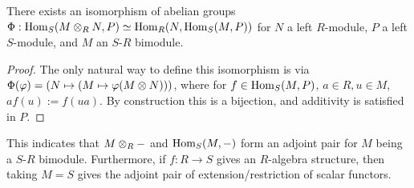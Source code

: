 \begin{proposition}
    There exists an isomorphism of abelian groups $\Phi: \mathrm{Hom}_S(M \otimes_R N, P) \simeq \mathrm{Hom}_R(N, \mathrm{Hom}_S(M, P))$ for $N$ a left $R$-module, $P$ a left $S$-module, and $M$ an $S$-$R$ bimodule. 
\end{proposition}

\begin{proof}
    The only natural way to define this isomorphism is via $\Phi(\varphi) = (N \mapsto (M \mapsto \varphi(M \otimes N)))$, where for $f\in \mathrm{Hom}_S(M, P)$, $a \in R, u \in M$, $af(u) := f(ua)$. By construction this is a bijection, and additivity is satisfied in $P$.
\end{proof}

\begin{remark}
    This indicates that $M \otimes_R -$ and $\mathrm{Hom}_S(M, -)$ form an adjoint pair for $M$ being a $S$-$R$ bimodule. Furthermore, if $f: R \to S$ gives an $R$-algebra structure, then taking $M = S$ gives the adjoint pair of extension/restriction of scalar functors.
\end{remark}
